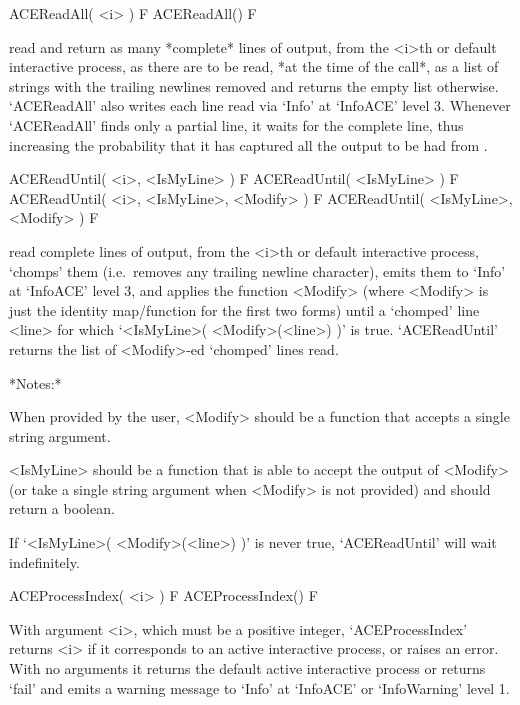 \>ACEReadAll( <i> ) F
\>ACEReadAll() F

read and return as many *complete* lines of {\ACE}  output,  from  the
<i>th or default interactive {\ACE} process, as there are to be  read,
*at the time of the call*, as a list  of  strings  with  the  trailing
newlines removed and returns the empty  list  otherwise.  `ACEReadAll'
also writes each line read via `Info' at `InfoACE' level  3.  Whenever
`ACEReadAll' finds only a partial line,  it  waits  for  the  complete
line, thus increasing the probability that it  has  captured  all  the
output to be had from {\ACE}.

\>ACEReadUntil( <i>, <IsMyLine> ) F
\>ACEReadUntil( <IsMyLine> ) F
\>ACEReadUntil( <i>, <IsMyLine>, <Modify> ) F
\>ACEReadUntil( <IsMyLine>, <Modify> ) F

read complete lines of  {\ACE}  output,  from  the  <i>th  or  default
interactive  {\ACE}  process,  \lq{}chomps'  them  (i.e.~removes   any
trailing newline character), emits them to `Info' at  `InfoACE'  level
3, and applies the function  <Modify>  (where  <Modify>  is  just  the
identity map/function for the first two forms) until  a  \lq{}chomped'
line <line>  for  which  `<IsMyLine>(  <Modify>(<line>)  )'  is  true.
`ACEReadUntil' returns the list  of  <Modify>-ed  \lq{}chomped'  lines
read.

*Notes:* 

When provided by the user, <Modify> should be a function that  accepts
a single string argument.

<IsMyLine> should be a function that is able to accept the  output  of
<Modify> (or take a  single  string  argument  when  <Modify>  is  not
provided) and should return a boolean.

If `<IsMyLine>( <Modify>(<line>) )' is never true, `ACEReadUntil' will
wait indefinitely.

\enditems


\beginitems

\>ACEProcessIndex( <i> ) F
\>ACEProcessIndex() F

With argument <i>, which must be a positive integer, `ACEProcessIndex'
returns <i> if it corresponds to an  active  interactive  process,  or
raises an error. With no  arguments  it  returns  the  default  active
interactive process or returns `fail' and emits a warning  message  to
`Info' at `InfoACE' or `InfoWarning' level 1.

